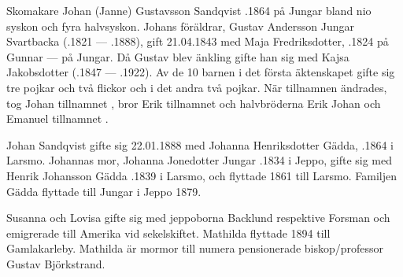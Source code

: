 Skomakare Johan (Janne) Gustavsson Sandqvist .1864 på Jungar bland nio syskon och fyra halvsyskon. Johans föräldrar, Gustav Andersson Jungar Svartbacka (.1821  ---  .1888), gift 21.04.1843 med Maja Fredriksdotter, .1824 på Gunnar  ---   på Jungar. Då Gustav blev änkling gifte han sig med Kajsa Jakobsdotter (.1847  ---  .1922). Av de 10 barnen i det första äktenskapet gifte sig tre pojkar och två flickor och i det andra två pojkar. När tillnamnen ändrades, tog Johan tillnamnet , bror Erik tillnamnet  och halvbröderna Erik Johan och Emanuel tillnamnet .


Johan Sandqvist gifte sig 22.01.1888 med Johanna Henriksdotter Gädda, .1864 i Larsmo. Johannas mor, Johanna Jonedotter Jungar .1834 i Jeppo, gifte sig med Henrik Johansson Gädda .1839 i Larsmo, och flyttade 1861 till Larsmo. Familjen Gädda flyttade till Jungar i Jeppo 1879.
\begin{jhchildren}
  \item {}
  \item {}
  \item {}
  \item {}
  \item {}
\end{jhchildren}
Susanna och Lovisa gifte sig med jeppoborna Backlund respektive Forsman och emigrerade till Amerika vid sekelskiftet. Mathilda flyttade 1894 till Gamlakarleby. Mathilda är mormor till numera pensionerade biskop/professor Gustav Björkstrand.

